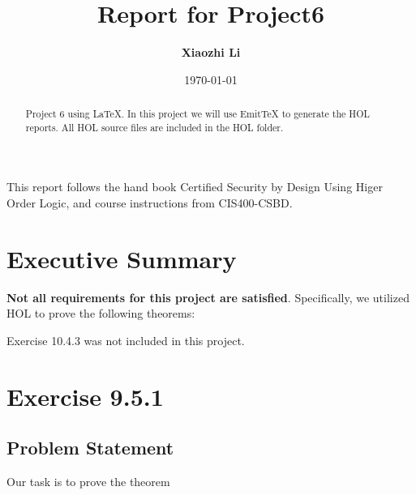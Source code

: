 \documentclass{report}
\title{Report for Project6}
\author{\textbf{Xiaozhi Li}}
\date{\today}
\begin{document}
\lstset{language=ML}


\maketitle{}

\begin{abstract}
  Project 6 using \LaTeX{}. In this project we will use EmitTeX to generate the HOL reports. All HOL source files are included in the HOL folder.
 \end{abstract}

\begin{acknowledgments}
 This report follows the hand book Certified Security by Design Using Higer Order Logic, and course instructions from CIS400-CSBD.
\end{acknowledgments}


\tableofcontents{}

\chapter{Executive Summary}


\textbf{Not all requirements for this project are satisfied}.
Specifically, we utilized HOL to prove the following theorems:
\begin{quote}
\HOLexerciseNineTheorems
\HOLexerciseOneZeroTheorems
\end{quote}

Exercise 10.4.3 was not included in this project.



\chapter{Exercise 9.5.1}
\label{ex 951}

\section{Problem Statement}

Our task is to prove the theorem
\HOLexerciseNineTheoremsabsorptionRule
\end{document}
